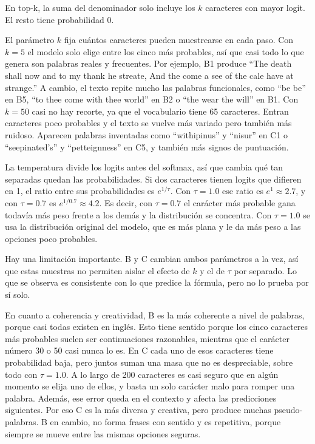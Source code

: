 \documentclass[11pt]{article}
\begin{document}
En top-k, la suma del denominador solo incluye los \(k\) caracteres con mayor logit. El resto tiene probabilidad 0.

El parámetro \(k\) fija cuántos caracteres pueden muestrearse en cada paso. Con \(k=5\) el modelo solo elige entre los cinco más probables, así que casi todo lo que genera son palabras reales y frecuentes. Por ejemplo, B1 produce ``The death shall now and to my thank he streate, And the come a see of the cale have at strange.'' A cambio, el texto repite mucho las palabras funcionales, como ``be be'' en B5, ``to thee come with thee world'' en B2 o ``the wear the will'' en B1. Con \(k=50\) casi no hay recorte, ya que el vocabulario tiene 65 caracteres. Entran caracteres poco probables y el texto se vuelve más variado pero también más ruidoso. Aparecen palabras inventadas como ``withipinus'' y ``nisur'' en C1 o ``seepinated's'' y ``petteignness'' en C5, y también más signos de puntuación.

La temperatura divide los logits antes del softmax, así que cambia qué tan separadas quedan las probabilidades. Si dos caracteres tienen logits que difieren en 1, el ratio entre sus probabilidades es \(e^{1/\tau}\). Con \(\tau=1.0\) ese ratio es \(e^{1} \approx 2.7\), y con \(\tau=0.7\) es \(e^{1/0.7} \approx 4.2\). Es decir, con \(\tau=0.7\) el carácter más probable gana todavía más peso frente a los demás y la distribución se concentra. Con \(\tau=1.0\) se usa la distribución original del modelo, que es más plana y le da más peso a las opciones poco probables.

Hay una limitación importante. B y C cambian ambos parámetros a la vez, así que estas muestras no permiten aislar el efecto de \(k\) y el de \(\tau\) por separado. Lo que se observa es consistente con lo que predice la fórmula, pero no lo prueba por sí solo.

En cuanto a coherencia y creatividad, B es la más coherente a nivel de palabras, porque casi todas existen en inglés. Esto tiene sentido porque los cinco caracteres más probables suelen ser continuaciones razonables, mientras que el carácter número 30 o 50 casi nunca lo es. En C cada uno de esos caracteres tiene probabilidad baja, pero juntos suman una masa que no es despreciable, sobre todo con \(\tau=1.0\). A lo largo de 200 caracteres es casi seguro que en algún momento se elija uno de ellos, y basta un solo carácter malo para romper una palabra. Además, ese error queda en el contexto y afecta las predicciones siguientes. Por eso C es la más diversa y creativa, pero produce muchas pseudo-palabras. B en cambio, no forma frases con sentido y es repetitiva, porque siempre se mueve entre las mismas opciones seguras.
\end{document}
